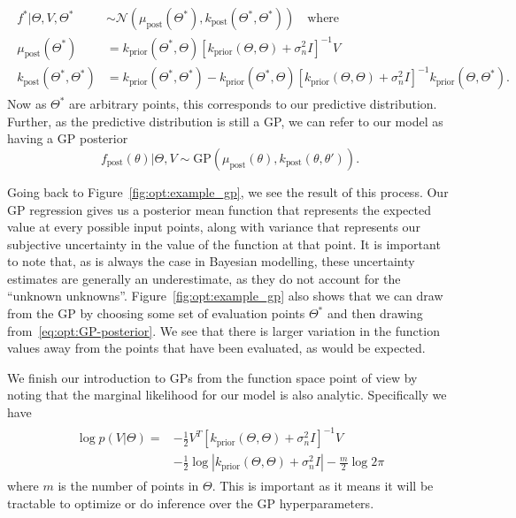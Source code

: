 \begin{align}
\label{eq:opt:GP-posterior}
\begin{split}
f^* | \Theta, V, \Theta^* &\sim \mathcal{N}\left(\mu_{\text{post}} \left(\Theta^*\right), 
k_{\text{post}} \left(\Theta^*,\Theta^*\right) \right) \quad \text{where} \\
\mu_{\text{post}}  \left(\Theta^*\right) & = k_{\text{prior}}\left(\Theta^*,{\Theta} \right) \left[k_{\text{prior}}\left({\Theta} ,{\Theta}  \right) + \sigma_n^2 I\right]^{-1} V\\
k_{\text{post}} \left(\Theta^*,\Theta^*\right) & = k_{\text{prior}} \left(\Theta^*,\Theta^*\right) - k_{\text{prior}}\left(\Theta^*,{\Theta} \right) \left[k_{\text{prior}}\left({\Theta},{\Theta} \right) + \sigma_n^2 I\right]^{-1} k_{\text{prior}}\left({\Theta} ,\Theta^*\right).
\end{split}
\end{align}
Now as $\Theta^*$ are arbitrary points, this corresponds to our predictive distribution.
Further, as the predictive distribution is still a GP, we can refer to our
model as having a GP posterior
\[
f_{\mathrm{post}} (\theta) | \Theta, V \sim \mathrm{GP}\left(\mu_{\text{post}} (\theta),k_{\text{post}}(\theta,\theta')\right).
\]

Going back to Figure~\ref{fig:opt:example_gp}, we see the result of this process.
Our GP regression gives us a posterior mean function that represents the expected value
at every possible input points, along with variance that represents our subjective
uncertainty in the value of the function at that point.  It is important to note that, as is
always the case in Bayesian modelling, these uncertainty estimates are generally  an underestimate,
as they do not account for the ``unknown unknowns''.  Figure~\ref{fig:opt:example_gp} also
shows that we can draw from the GP by choosing some set of evaluation points $\Theta^*$ and
then drawing from~\eqref{eq:opt:GP-posterior}.  We see that there is larger variation in the
function values away from the points that have been evaluated, as would be expected.

We finish our introduction to GPs from the function space point of view by noting that the
marginal likelihood for our model is also analytic.  Specifically we have
\begin{align}
\label{eq:opt:GP-ML}
\begin{split}
\log p(V | \Theta) = &-\frac{1}{2} V^T \left[k_{\text{prior}}\left({\Theta} ,{\Theta}  \right) + \sigma_n^2 I\right]^{-1} V \\
&-\frac{1}{2} \log \left|k_{\text{prior}}\left({\Theta} ,{\Theta}  \right) + \sigma_n^2 I\right|-\frac{m}{2} \log 2\pi
\end{split}
\end{align}
where $m$ is the number of points in $\Theta$.  This is important as it means it will be tractable to
optimize or do inference over the GP hyperparameters.

